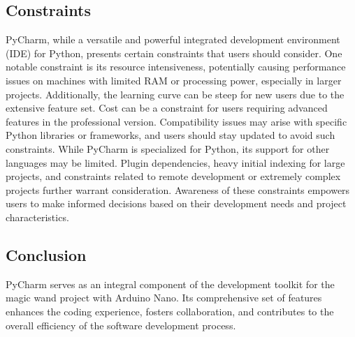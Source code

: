 \subsection{Constraints}
PyCharm, while a versatile and powerful integrated development environment (IDE) for Python, presents certain constraints that users should consider. One notable constraint is its resource intensiveness, potentially causing performance issues on machines with limited RAM or processing power, especially in larger projects. Additionally, the learning curve can be steep for new users due to the extensive feature set. Cost can be a constraint for users requiring advanced features in the professional version. Compatibility issues may arise with specific Python libraries or frameworks, and users should stay updated to avoid such constraints. While PyCharm is specialized for Python, its support for other languages may be limited. Plugin dependencies, heavy initial indexing for large projects, and constraints related to remote development or extremely complex projects further warrant consideration. Awareness of these constraints empowers users to make informed decisions based on their development needs and project characteristics.
\subsection{Conclusion}
PyCharm serves as an integral component of the development toolkit for the magic wand project with Arduino Nano. Its comprehensive set of features enhances the coding experience, fosters collaboration, and contributes to the overall efficiency of the software development process.
